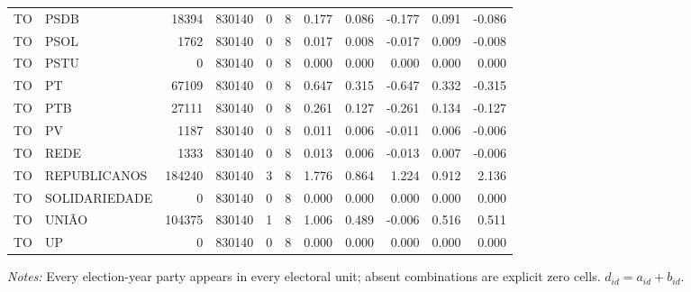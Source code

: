 \begin{landscape}
\begin{longtable}{llrrrrrrrrr}
TO & PSDB & 18394 & 830140 & 0 & 8 & 0.177 & 0.086 & -0.177 & 0.091 & -0.086 \\
TO & PSOL & 1762 & 830140 & 0 & 8 & 0.017 & 0.008 & -0.017 & 0.009 & -0.008 \\
TO & PSTU & 0 & 830140 & 0 & 8 & 0.000 & 0.000 & 0.000 & 0.000 & 0.000 \\
TO & PT & 67109 & 830140 & 0 & 8 & 0.647 & 0.315 & -0.647 & 0.332 & -0.315 \\
TO & PTB & 27111 & 830140 & 0 & 8 & 0.261 & 0.127 & -0.261 & 0.134 & -0.127 \\
TO & PV & 1187 & 830140 & 0 & 8 & 0.011 & 0.006 & -0.011 & 0.006 & -0.006 \\
TO & REDE & 1333 & 830140 & 0 & 8 & 0.013 & 0.006 & -0.013 & 0.007 & -0.006 \\
TO & REPUBLICANOS & 184240 & 830140 & 3 & 8 & 1.776 & 0.864 & 1.224 & 0.912 & 2.136 \\
TO & SOLIDARIEDADE & 0 & 830140 & 0 & 8 & 0.000 & 0.000 & 0.000 & 0.000 & 0.000 \\
TO & UNIÃO & 104375 & 830140 & 1 & 8 & 1.006 & 0.489 & -0.006 & 0.516 & 0.511 \\
TO & UP & 0 & 830140 & 0 & 8 & 0.000 & 0.000 & 0.000 & 0.000 & 0.000 \\
\end{longtable}
\noindent\footnotesize\textit{Notes:} Every election-year party appears in every electoral unit; absent combinations are explicit zero cells. \(d_{id}=a_{id}+b_{id}\).
\endgroup
\end{landscape}
